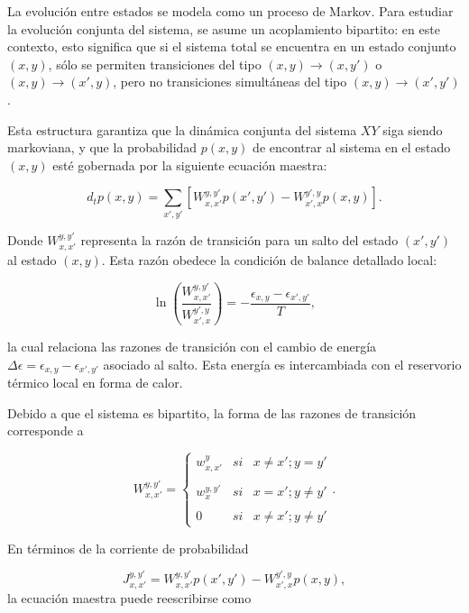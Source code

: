 La evolución entre estados se modela como un proceso de Markov\cite{van1992stochastic}. Para estudiar la evolución conjunta del sistema, se asume un acoplamiento bipartito: en este contexto, esto significa que si el sistema total se encuentra en un estado conjunto $(x,y)$, sólo se permiten transiciones del tipo $(x,y) \to (x,y')$ o $(x,y) \to (x',y)$, pero no transiciones simultáneas del tipo $(x,y) \to (x',y')$.

Esta estructura garantiza que la dinámica conjunta del sistema \( XY \) siga siendo markoviana, y que la probabilidad \( p(x,y) \) de encontrar al sistema en el estado \( (x,y) \) esté gobernada por la siguiente ecuación maestra:

\begin{equation*}
    d_{t}p(x,y) = \sum_{x',y'} \left[ W_{x,x'}^{y,y'}p(x',y')  - W_{x',x}^{y',y}p(x,y) \right].
\end{equation*}

Donde \( W_{x,x'}^{y,y'} \) representa la razón de transición para un salto del estado \( (x',y') \) al estado \( (x,y) \). Esta razón obedece la condición de balance detallado local:

\[
\ln \left( \frac{W_{x,x'}^{y,y'}}{W_{x',x}^{y',y}} \right) = -\frac{\epsilon_{x,y} - \epsilon_{x',y'}}{T},
\]

la cual relaciona las razones de transición con el cambio de energía \( \Delta \epsilon = \epsilon_{x,y} - \epsilon_{x',y'} \) asociado al salto. Esta energía es intercambiada con el reservorio térmico local en forma de calor.

Debido a que el sistema es bipartito, la forma de las razones de transición corresponde a

\begin{equation*}
    W_{x,x'}^{y,y'} = \left\{ \begin{array}{lcc} w_{x,x'}^{y} & si & x \neq x'; y=y' \\ \\ w_{x}^{y,y'} & si & x=x';y\neq y'\\ \\ 0 & si & x \neq x'; y \neq y' \end{array} \right..
\end{equation*}

En términos de la corriente de probabilidad 

\begin{equation*}
    J_{x,x'}^{y,y'} = W_{x,x'}^{y,y'}p(x',y') - W_{x',x}^{y',y}p(x,y),
\end{equation*}
la ecuación maestra puede reescribirse como 

